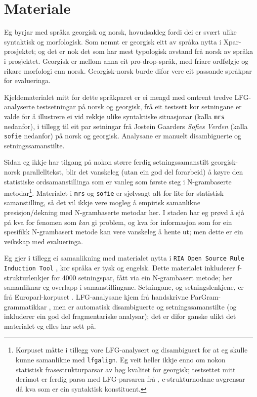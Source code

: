 \documentclass[12pt,a4paper,oneside,draft]{report}
\begin{document}
 
 
  
\section{Materiale}
\label{sec-5.1}

Eg byrjar med språka georgisk og norsk, hovudsakleg
 fordi dei er svært ulike syntaktisk og morfologisk. Som nemnt er
 georgisk eitt av språka nytta i Xpar-prosjektet; og det er nok det
 som har mest typologisk avstand frå norsk av språka i prosjektet.
 Georgisk er mellom anna eit pro-drop-språk, med friare ordfølgje og
 rikare morfologi enn norsk. Georgisk-norsk burde difor vere eit
 passande språkpar for evalueringa.

Kjeldematerialet mitt for dette språkparet er ei mengd med
 omtrent tredve LFG-analyserte testsetningar på norsk og georgisk, frå
 eit testsett kor setningane er valde for å illustrere ei vid rekkje
 ulike syntaktiske situasjonar (kalla \texttt{mrs} nedanfor), i tillegg til
 eit par setningar frå Jostein Gaarders \emph{Sofies Verden} (kalla \texttt{sofie}
 nedanfor) på norsk og georgisk. Analysane er manuelt disambiguerte og
 setningssamanstilte.

Sidan eg ikkje har tilgang på nokon større ferdig setningssamanstilt
 georgisk-norsk parallelltekst, blir det vanskeleg (utan ein god del
 forarbeid) å køyre den statistiske ordsamanstillinga som er vanleg
 som første steg i N-grambaserte metodar\footnote{Korpuset måtte i tillegg vore LFG-analysert og disambiguert
        for at eg skulle kunne samanlikne med \texttt{lfgalign}. Eg veit
        heller ikkje enno om nokon statistisk frasestrukturparsar av
        høg kvalitet for georgisk; testsettet mitt derimot er ferdig
        parsa med LFG-parsaren frå \citet{meurer2008cgg},
        c\hyp{}strukturnodane avgrensar då kva som er ein syntaktisk
        konstituent. }. Materialet i \texttt{mrs}
 og \texttt{sofie} er sjølvsagt alt for lite for statistisk samanstilling, så
 det vil ikkje vere mogleg å empirisk samanlikne presisjon/dekning med
 N-grambaserte metodar her. I staden har eg prøvd å sjå på kva for
 fenomen som \emph{kan} gi problem, og kva for informasjon som for ein
 spesifikk N-grambasert metode kan vere vanskeleg å hente ut; men
 dette er ein veikskap med evalueringa.

Eg gjer i tillegg ei samanlikning med materialet nytta i \texttt{RIA Open  Source Rule Induction Tool} \citep{graham2009osr,graham2009fts}, kor
 språka er tysk og engelsk. Dette materialet inkluderer
 f\hyp{}strukturlenkjer for 4000 setningspar, fått via ein N-grambasert
 metode; her samanliknar eg overlapp i samanstillingane.  Setningane,
 og setningslenkjene, er frå Europarl-korpuset
 \citep{koehn2005epc}. LFG-analysane kjem frå handskrivne
 ParGram-grammatikkar \citep[m.a.~][]{kaplan2002aeg}, men er automatisk
 disambiguerte og setningssamanstilte (og inkluderer ein god del
 fragmentariske analysar); det er difor ganske ulikt det materialet eg
 elles har sett på.
\end{document}
